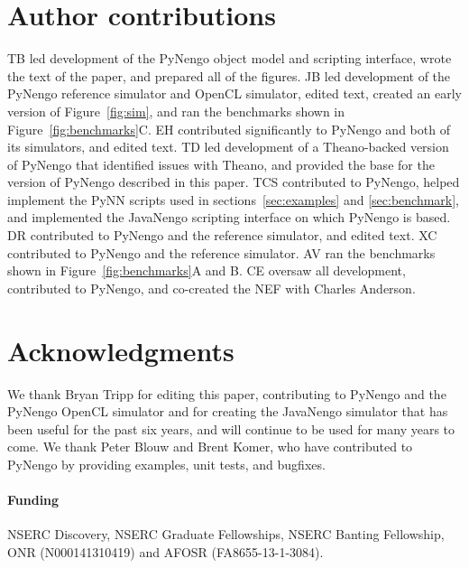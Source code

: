 \documentclass{frontiersSCNS}
\begin{document}
\section*{Author contributions}

TB led development of the
PyNengo object model and scripting interface,
wrote the text of the paper,
and prepared all of the figures.
JB led development of
the PyNengo reference simulator and OpenCL simulator,
edited text, created an early version
of Figure~\ref{fig:sim},
and ran the benchmarks shown in
Figure~\ref{fig:benchmarks}C.
EH contributed significantly
to PyNengo and both of its simulators, and edited text.
TD led development
of a Theano-backed
version of PyNengo that
identified issues with Theano,
and provided the base for
the version of PyNengo described in this paper.
TCS contributed
to PyNengo, helped implement
the PyNN scripts used in
sections~\ref{sec:examples} and \ref{sec:benchmark},
and implemented the JavaNengo scripting interface
on which PyNengo is based.
DR contributed
to PyNengo and the reference simulator,
and edited text.
XC contributed to PyNengo
and the reference simulator.
AV ran the benchmarks
shown in Figure~\ref{fig:benchmarks}A and B.
CE oversaw all development,
contributed to PyNengo,
and co-created the NEF with Charles Anderson.

\section*{Acknowledgments}

We thank Bryan Tripp
for editing this paper,
contributing to PyNengo
and the PyNengo OpenCL simulator
and for creating the JavaNengo simulator
that has been useful
for the past six years,
and will continue
to be used for many years to come.
We thank Peter Blouw and Brent Komer,
who have contributed
to PyNengo by providing examples,
unit tests, and bugfixes.

\paragraph{Funding\textcolon}
NSERC Discovery, NSERC Graduate Fellowships,
NSERC Banting Fellowship, ONR (N000141310419)
and AFOSR (FA8655-13-1-3084).




\clearpage
\end{document}
